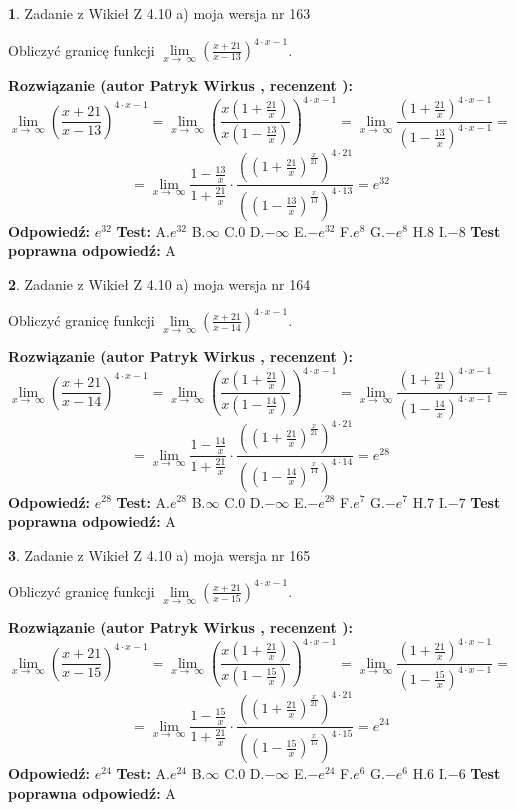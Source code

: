 \documentclass[12pt, a4paper]{article}
\theoremstyle{definition} %
\newtheorem{zad}{}
\newcommand{\zadStart}[1]{\begin{zad}#1\newline}
\newcommand{\zadStop}{\end{zad}}
\newcommand{\rozwStart}[2]{\noindent \textbf{Rozwiązanie (autor #1 , recenzent #2): }\newline}
\newcommand{\rozwStop}{\newline}
\newcommand{\odpStart}{\noindent \textbf{Odpowiedź:}\newline}
\newcommand{\odpStop}{\newline}
\newcommand{\testStart}{\noindent \textbf{Test:}\newline}
\newcommand{\testStop}{\newline}
\newcommand{\kluczStart}{\noindent \textbf{Test poprawna odpowiedź:}\newline}
\newcommand{\kluczStop}{\newline}
\begin{document}
\zadStart{Zadanie z Wikieł Z 4.10 a) moja wersja nr 163}

Obliczyć granicę funkcji  $\lim\limits_{x\to\ \infty}(\frac{x+21}{x-13})^{4\cdot x-1}$.
\zadStop
\rozwStart{Patryk Wirkus}{}
$$\lim\limits_{x\to\ \infty}(\frac{x+21}{x-13})^{4\cdot x-1} = \lim\limits_{x\to\ \infty}(\frac{x(1+\frac{21}{x})}{x(1-\frac{13}{x})})^{4\cdot x-1}=\lim\limits_{x\to\ \infty}\frac{(1+\frac{21}{x})^{4\cdot x-1}}{(1-\frac{13}{x})^{4\cdot x-1}}=$$
$$=\lim\limits_{x\to\ \infty}\frac{1-\frac{13}{x}}{1+\frac{21}{x}}\cdot\frac{((1+\frac{21}{x})^{\frac{x}{21}})^{4\cdot21}}{((1-\frac{13}{x})^{\frac{x}{13}})^{4\cdot13}}=e^{32}$$
\rozwStop
\odpStart
$e^{32}$
\odpStop
\testStart
A.$e^{32}$ B.$\infty$ C.$0$ D.$-\infty$ E.$-e^{32}$
F.$e^{8}$ G.$-e^{8}$
H.$8$
I.$-8$
\testStop
\kluczStart
A
\kluczStop



\zadStart{Zadanie z Wikieł Z 4.10 a) moja wersja nr 164}

Obliczyć granicę funkcji  $\lim\limits_{x\to\ \infty}(\frac{x+21}{x-14})^{4\cdot x-1}$.
\zadStop
\rozwStart{Patryk Wirkus}{}
$$\lim\limits_{x\to\ \infty}(\frac{x+21}{x-14})^{4\cdot x-1} = \lim\limits_{x\to\ \infty}(\frac{x(1+\frac{21}{x})}{x(1-\frac{14}{x})})^{4\cdot x-1}=\lim\limits_{x\to\ \infty}\frac{(1+\frac{21}{x})^{4\cdot x-1}}{(1-\frac{14}{x})^{4\cdot x-1}}=$$
$$=\lim\limits_{x\to\ \infty}\frac{1-\frac{14}{x}}{1+\frac{21}{x}}\cdot\frac{((1+\frac{21}{x})^{\frac{x}{21}})^{4\cdot21}}{((1-\frac{14}{x})^{\frac{x}{14}})^{4\cdot14}}=e^{28}$$
\rozwStop
\odpStart
$e^{28}$
\odpStop
\testStart
A.$e^{28}$ B.$\infty$ C.$0$ D.$-\infty$ E.$-e^{28}$
F.$e^{7}$ G.$-e^{7}$
H.$7$
I.$-7$
\testStop
\kluczStart
A
\kluczStop



\zadStart{Zadanie z Wikieł Z 4.10 a) moja wersja nr 165}

Obliczyć granicę funkcji  $\lim\limits_{x\to\ \infty}(\frac{x+21}{x-15})^{4\cdot x-1}$.
\zadStop
\rozwStart{Patryk Wirkus}{}
$$\lim\limits_{x\to\ \infty}(\frac{x+21}{x-15})^{4\cdot x-1} = \lim\limits_{x\to\ \infty}(\frac{x(1+\frac{21}{x})}{x(1-\frac{15}{x})})^{4\cdot x-1}=\lim\limits_{x\to\ \infty}\frac{(1+\frac{21}{x})^{4\cdot x-1}}{(1-\frac{15}{x})^{4\cdot x-1}}=$$
$$=\lim\limits_{x\to\ \infty}\frac{1-\frac{15}{x}}{1+\frac{21}{x}}\cdot\frac{((1+\frac{21}{x})^{\frac{x}{21}})^{4\cdot21}}{((1-\frac{15}{x})^{\frac{x}{15}})^{4\cdot15}}=e^{24}$$
\rozwStop
\odpStart
$e^{24}$
\odpStop
\testStart
A.$e^{24}$ B.$\infty$ C.$0$ D.$-\infty$ E.$-e^{24}$
F.$e^{6}$ G.$-e^{6}$
H.$6$
I.$-6$
\testStop
\kluczStart
A
\kluczStop
\end{document}
